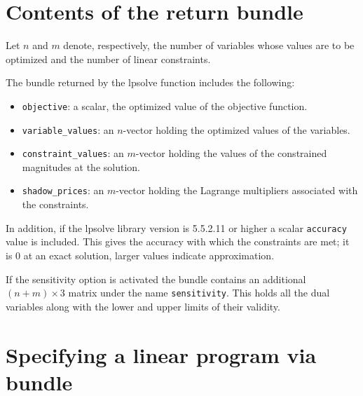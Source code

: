 \documentclass{article}
\begin{document}
\section{Contents of the return bundle}
\label{sec:retval}

Let $n$ and $m$ denote, respectively, the number of variables whose
values are to be optimized and the number of linear constraints.

The bundle returned by the \textsf{lpsolve} function includes the
following:
\begin{itemize}
\item \texttt{objective}: a scalar, the optimized value of the objective
  function.
\item \texttt{variable\_values}: an $n$-vector holding the optimized
  values of the variables.
\item \texttt{constraint\_values}: an $m$-vector holding the values of
  the constrained magnitudes at the solution.
\item \texttt{shadow\_prices}: an $m$-vector holding the Lagrange
  multipliers associated with the constraints.
\end{itemize}

In addition, if the \textsf{lpsolve} library version is 5.5.2.11 or
higher a scalar \texttt{accuracy} value is included. This gives the
accuracy with which the constraints are met; it is 0 at an exact
solution, larger values indicate approximation.

If the sensitivity option is activated the bundle contains an
additional $(n+m) \times 3$ matrix under the name
\texttt{sensitivity}. This holds all the dual variables along with the
lower and upper limits of their validity.

\section{Specifying a linear program via bundle}
\label{sec:lp-bundle}
\end{document}
